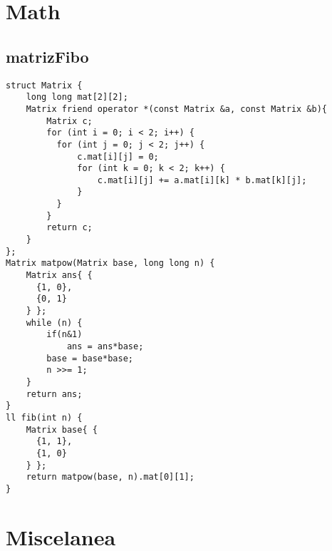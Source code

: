 \section*{Math}

\subsection*{matrizFibo}
\begin{lstlisting}
struct Matrix {
    long long mat[2][2];
    Matrix friend operator *(const Matrix &a, const Matrix &b){
        Matrix c;
        for (int i = 0; i < 2; i++) {
          for (int j = 0; j < 2; j++) {
              c.mat[i][j] = 0;
              for (int k = 0; k < 2; k++) {
                  c.mat[i][j] += a.mat[i][k] * b.mat[k][j];
              }
          }
        }
        return c;
    }
};
Matrix matpow(Matrix base, long long n) {
    Matrix ans{ {
      {1, 0},
      {0, 1}
    } };
    while (n) {
        if(n&1)
            ans = ans*base;
        base = base*base;
        n >>= 1;
    }
    return ans;
}
ll fib(int n) {
    Matrix base{ {
      {1, 1},
      {1, 0}
    } };
    return matpow(base, n).mat[0][1];
}\end{lstlisting}

\section*{Miscelanea}

